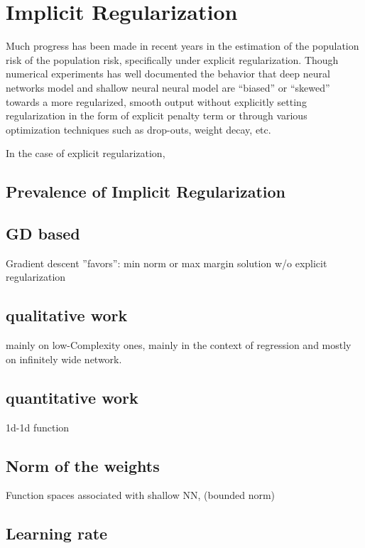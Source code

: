 \chapter{Implicit Regularization}

Much progress has been made in recent years in the estimation of the population risk of the population risk, specifically under explicit regularization.
Though numerical experiments has well documented \TOCITE the behavior that deep neural networks model and shallow neural neural model are ``biased'' or ``skewed'' towards 
a more regularized, smooth output without explicitly setting regularization in the form of explicit penalty term or through various 
optimization techniques such as drop-outs, weight decay, etc.

In the case of explicit regularization, 

\section{Prevalence of Implicit Regularization}


\section{GD based}

Gradient descent ”favors”: min norm or max margin solution w/o explicit regularization

\section{qualitative work}

mainly on low-Complexity ones, mainly in the context of regression
and mostly on infinitely wide network.

\section{quantitative work}

1d-1d function 

\section{Norm of the weights}

Function spaces associated with shallow NN, (bounded norm)

\section{Learning rate}

